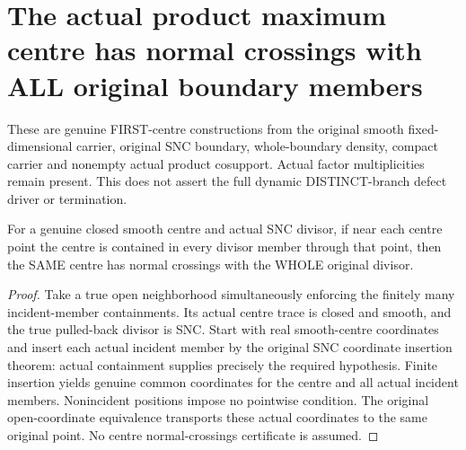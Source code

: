 \section{The actual product maximum centre has normal crossings with ALL original boundary members}

These are genuine FIRST-centre constructions from the original smooth fixed-dimensional carrier, original SNC boundary, whole-boundary density, compact carrier and nonempty actual product cosupport. Actual factor multiplicities remain present. This does not assert the full dynamic DISTINCT-branch defect driver or termination.

\begin{lemma}
\label{hir:sharp-local-incident-containment-actual-centre-normal-crossings}
\leanok
For a genuine closed smooth centre and actual SNC divisor, if near each centre point the centre is contained in every divisor member through that point, then the SAME centre has normal crossings with the WHOLE original divisor.
\end{lemma}
\begin{proof}
Take a true open neighborhood simultaneously enforcing the finitely many incident-member containments. Its actual centre trace is closed and smooth, and the true pulled-back divisor is SNC. Start with real smooth-centre coordinates and insert each actual incident member by the original SNC coordinate insertion theorem: actual containment supplies precisely the required hypothesis. Finite insertion yields genuine common coordinates for the centre and all actual incident members. Nonincident positions impose no pointwise condition. The original open-coordinate equivalence transports these actual coordinates to the same original point. No centre normal-crossings certificate is assumed.
\end{proof}

